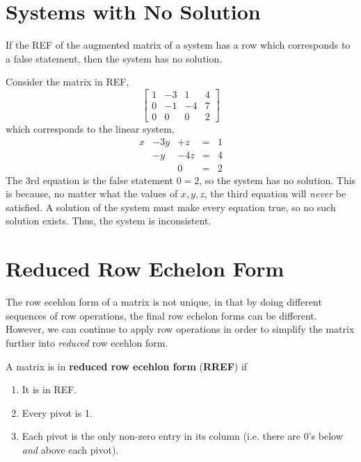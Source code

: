 \documentclass[letterpaper,12pt]{article}
\begin{document}
\section*{Systems with No Solution}
If the REF of the augmented matrix of a system has a row which corresponds to a false statement, then the system has no solution.

\begin{example}
Consider the matrix in REF,
\begin{equation*}
    \begin{bmatrix}
    1 & -3 & 1 & 4 \\
    0 & -1 & -4 & 7 \\
    0 & 0 & 0 & 2
    \end{bmatrix}
\end{equation*}
which corresponds to the linear system,
\begin{equation*}
    \begin{array}{rrrrr}
        x & -3y & + z & = & 1 \\
        & -y & -4 z & = & 4 \\
        & & 0 & = & 2
    \end{array}
\end{equation*}
The 3rd equation is the false statement $0 = 2$, so the system has no solution. This is because, no matter what the values of $x, y, z$, the third equation will \textit{never} be satisfied. A solution of the system must make every equation true, so no such solution exists. Thus, the system is inconsistent.
\end{example}

\section*{Reduced Row Echelon Form}
The row ecehlon form of a matrix is not unique, in that by doing different sequences of row operations, the final row echelon forms can be different. However, we can continue to apply row operations in order to simplify the matrix further into \textit{reduced} row ecehlon form.

\begin{definition}
A matrix is in \textbf{reduced row ecehlon form} (\textbf{RREF}) if
\begin{enumerate}
    \item It is in REF.
    \item Every pivot is 1.
    \item Each pivot is the only non-zero entry in its column (i.e. there are 0's below \textit{and} above each pivot).
\end{enumerate}
\end{definition}
\end{document}
